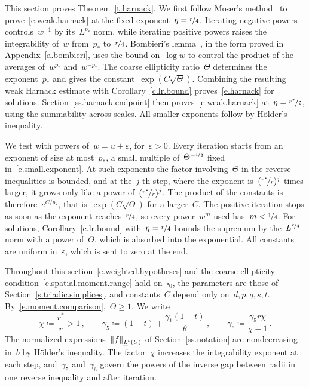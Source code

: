 \documentclass[11pt,letterpaper]{article}
\numberwithin{equation}{section}
\theoremstyle{definition}
\newcommand{\eps}{\varepsilon}
\newcommand{\nf}{\nicefrac}
\newcommand{\cu}{\square}
\DeclarePairedDelimiter{\norm}{\lVert}{\rVert}
\begin{document}
This section proves Theorem~\ref{t.harnack}. We first follow Moser's method~\cite{Moser2} to prove~\eqref{e.weak.harnack} at the fixed exponent~$\eta=\nf r4$. Iterating negative powers controls~$w^{-1}$ by its~$L^{p_*}$ norm, while iterating positive powers raises the integrability of~$w$ from~$p_*$ to~$\nf r4$. Bombieri's lemma~\cite{Bombieri.Giusti}, in the form proved in Appendix~\ref{a.bombieri}, uses the bound on~$\log w$ to control the product of the averages of~$w^{p_*}$ and~$w^{-p_*}$. The coarse ellipticity ratio~$\Theta$ determines the exponent~$p_*$ and gives the constant~$\exp(C\sqrt\Theta)$. Combining the resulting weak Harnack estimate with Corollary~\ref{c.lr.bound} proves~\eqref{e.harnack} for solutions. Section~\ref{ss.harnack.endpoint} then proves~\eqref{e.weak.harnack} at~$\eta=\nf{r^*}2$, using the summability across scales. All smaller exponents follow by H\"older's inequality.

\smallskip

We test with powers of~$w=u+\eps$, for~$\eps>0$. Every iteration starts from an exponent of size at most~$p_*$, a small multiple of~$\Theta^{-\nf12}$ fixed in~\eqref{e.small.exponent}. At such exponents the factor involving~$\Theta$ in the reverse inequalities is bounded, and at the~$j$-th step, where the exponent is~$(\nf{r^*}r)^j$ times larger, it grows only like a power of~$(\nf{r^*}r)^j$. The product of the constants is therefore~$e^{C/p_*}$, that is~$\exp(C\sqrt\Theta)$ for a larger~$C$. The positive iteration stops as soon as the exponent reaches~$\nf r4$, so every power~$w^m$ used has~$m<\nf14$. For solutions, Corollary~\ref{c.lr.bound} with~$\eta=\nf r4$ bounds the supremum by the~$L^{\nf r4}$ norm with a power of~$\Theta$, which is absorbed into the exponential. All constants are uniform in~$\eps$, which is sent to zero at the end.

\smallskip

Throughout this section~\eqref{e.weighted.hypotheses} and the coarse ellipticity condition~\eqref{e.spatial.moment.range} hold on~$\cu_0$, the parameters are those of Section~\ref{s.triadic.simplices}, and constants~$C$ depend only on~$d,p,q,s,t$. By~\eqref{e.moment.comparison},~$\Theta\geq1$. We write
\begin{equation*}
	\chi\coloneqq\frac{r^*}r>1\,,\qquad \gamma_5\coloneqq(1-t)+\frac{\gamma_1(1-t)}\theta\,,\qquad \gamma_6\coloneqq\frac{\gamma_5r\chi}{\chi-1}\,.
\end{equation*}
The normalized expressions~$\norm{f}_{\underline L^b(U)}$ of Section~\ref{ss.notation} are nondecreasing in~$b$ by H\"older's inequality. The factor~$\chi$ increases the integrability exponent at each step, and~$\gamma_5$ and~$\gamma_6$ govern the powers of the inverse gap between radii in one reverse inequality and after iteration.
\end{document}
